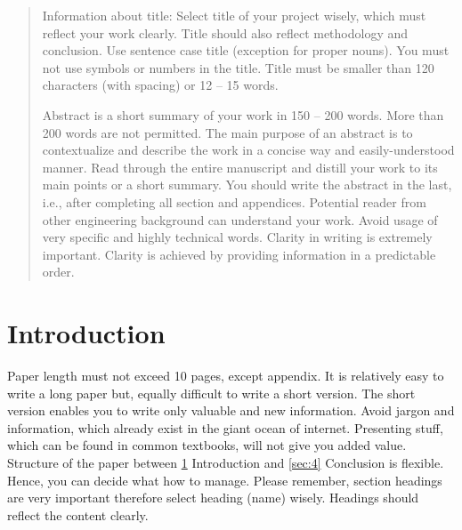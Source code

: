 \documentclass[subscriptcorrection,upint,varvw,mathalfa=cal=euler,barcolor=black,balance,hyphenate,french,pdf-a,nolists]{asmejour}
\begin{document}
\begin{abstract}
Information about title: Select title of your project wisely, which must reflect your work clearly. Title should also reflect methodology and conclusion. Use sentence case title (exception for proper nouns). You must not use symbols or numbers in the title. Title must be smaller than 120 characters (with spacing) or 12 -- 15 words.

Abstract is a short summary of your work in 150 -- 200 words. More than 200 words are not permitted. The main purpose of an abstract is to contextualize and describe the work in a concise way and easily-understood manner. Read through the entire manuscript and distill your work to its main points or a short summary. You should write the abstract in the last, i.e., after completing all section and appendices. Potential reader from other engineering background can understand your work. Avoid usage of very specific and highly technical words. Clarity in writing is extremely important. Clarity is achieved by providing information in a predictable order.
\end{abstract}


\date{\today}%

\maketitle %


\section{Introduction}
\label{sec:1}
Paper length must not exceed 10 pages, except appendix. It is relatively easy to write a long paper but, equally difficult to write a short version. The short version enables you to write only valuable and new information. Avoid jargon and information, which already exist in the giant ocean of internet. Presenting stuff, which can be found in common textbooks, will not give you added value. Structure of the paper between \ref{sec:1} Introduction and \ref{sec:4} Conclusion is flexible. Hence, you can decide what how to manage. Please remember, section headings are very important therefore select heading (name) wisely. Headings should reflect the content clearly.
\end{document}
